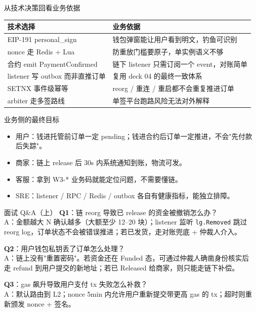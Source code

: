 \begin{frame}{从技术决策回看业务依据}
\begin{tabular}{@{}ll@{}}
\toprule
技术选择                        & 业务依据 \\
\midrule
EIP-191 personal\_sign          & 钱包弹窗能让用户看到明文，钓鱼可识别 \\
nonce 走 Redis + Lua            & 防重放门槛要原子，单实例语义不够 \\
合约 emit PaymentConfirmed       & 链下 listener 只需订阅一个 event，对账简单 \\
listener 写 outbox 而非直推订单 & 复用 deck 04 的最终一致体系 \\
SETNX 事件级幂等                & reorg / 重连 / 重启都不会重复推进订单 \\
arbiter 走多签路线              & 单签平台跑路风险无法对外解释 \\
\bottomrule
\end{tabular}
\end{frame}

\begin{frame}{业务侧的最终目标}
\begin{itemize}
  \item 用户：钱进托管前订单一定 pending；钱进合约后订单一定推进，不会"先付款后失踪"。
  \item 商家：链上 release 后 30s 内系统通知到账，物流可发。
  \item 客服：拿到 W3-* 业务码就能定位问题，不需要懂链。
  \item SRE：listener / RPC / Redis / outbox 各自有健康指标，能独立排障。
\end{itemize}
\end{frame}

\appendix

\begin{frame}{面试 Q\&A（上）}
\textbf{Q1}：链 reorg 导致已 release 的资金被撤销怎么办？\\
\hspace{4mm}\small A：金额越大 N 确认越多（大额至少 12--20 块）；listener 监听 \texttt{lg.Removed} 跳过 reorg log，订单状态不会被错误推进；若已发货，走对账兜底 + 仲裁人介入。

\vspace{2mm}
\textbf{Q2}：用户钱包私钥丢了订单怎么处理？\\
\hspace{4mm}\small A：链上没有"重置密码"。若资金还在 Funded 态，可通过仲裁人确凿身份核实后走 refund 到用户提交的新地址；若已 Released 给商家，则只能走链下补偿。

\vspace{2mm}
\textbf{Q3}：gas 飙升导致用户支付 tx 失败怎么补救？\\
\hspace{4mm}\small A：默认路由到 L2；nonce 5min 内允许用户重新提交带更高 gas 的 tx；超时则重新颁发 nonce + 签名。
\end{frame}

